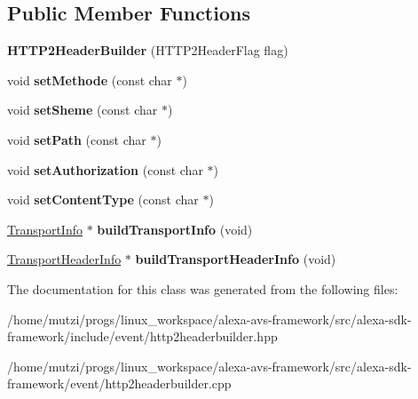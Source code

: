 \subsection*{Public Member Functions}
\begin{DoxyCompactItemize}
\item 
\mbox{\label{classAlexaEvent_1_1HTTP2HeaderBuilder_a871e37bafb0701495788b633361c9e32}} 
{\bfseries H\+T\+T\+P2\+Header\+Builder} (H\+T\+T\+P2\+Header\+Flag flag)
\item 
\mbox{\label{classAlexaEvent_1_1HTTP2HeaderBuilder_a9cc49469fc49c62f1909dfbd772da048}} 
void {\bfseries set\+Methode} (const char $\ast$)
\item 
\mbox{\label{classAlexaEvent_1_1HTTP2HeaderBuilder_a24d4972840f4d58830b68521c9252886}} 
void {\bfseries set\+Sheme} (const char $\ast$)
\item 
\mbox{\label{classAlexaEvent_1_1HTTP2HeaderBuilder_a9472826185009a92e8115562ea7ecfa4}} 
void {\bfseries set\+Path} (const char $\ast$)
\item 
\mbox{\label{classAlexaEvent_1_1HTTP2HeaderBuilder_a1a634d496593ce612c3950383a915e83}} 
void {\bfseries set\+Authorization} (const char $\ast$)
\item 
\mbox{\label{classAlexaEvent_1_1HTTP2HeaderBuilder_a2dfbb67d45a2cd0070b4fd6b09d59021}} 
void {\bfseries set\+Content\+Type} (const char $\ast$)
\item 
\mbox{\label{classAlexaEvent_1_1HTTP2HeaderBuilder_a4bb3e56dbb89899349811157cea3c87d}} 
\hyperlink{classAlexaEvent_1_1TransportInfo}{Transport\+Info} $\ast$ {\bfseries build\+Transport\+Info} (void)
\item 
\mbox{\label{classAlexaEvent_1_1HTTP2HeaderBuilder_a35b694be1af0b9afb1e69515bdbe191b}} 
\hyperlink{classAlexaEvent_1_1TransportHeaderInfo}{Transport\+Header\+Info} $\ast$ {\bfseries build\+Transport\+Header\+Info} (void)
\end{DoxyCompactItemize}


The documentation for this class was generated from the following files\+:\begin{DoxyCompactItemize}
\item 
/home/mutzi/progs/linux\+\_\+workspace/alexa-\/avs-\/framework/src/alexa-\/sdk-\/framework/include/event/http2headerbuilder.\+hpp\item 
/home/mutzi/progs/linux\+\_\+workspace/alexa-\/avs-\/framework/src/alexa-\/sdk-\/framework/event/http2headerbuilder.\+cpp\end{DoxyCompactItemize}

